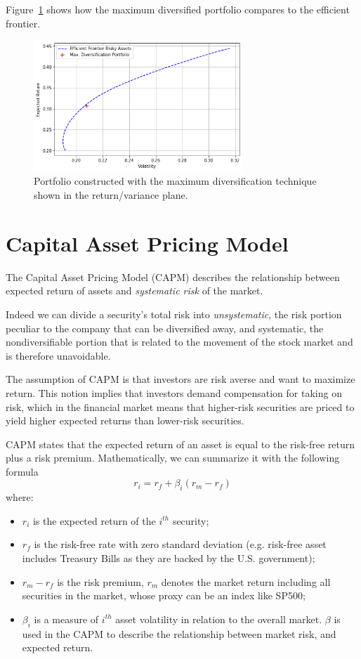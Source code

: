 Figure~\ref{fig:max_div} shows how the maximum diversified portfolio compares to the efficient frontier.

\begin{figure}[htb]
	\centering
	\includegraphics[width=0.7\textwidth]{figures/max_div.png}
	\caption{Portfolio constructed with the maximum diversification technique shown in the return/variance plane.}
	\label{fig:max_div}
\end{figure}

\section{Capital Asset Pricing Model}
\label{sec:capm}
The Capital Asset Pricing Model (CAPM) describes the relationship between expected return of assets and \emph{systematic risk} of the market.

Indeed we can divide a security’s total risk into \emph{unsystematic}, the risk portion peculiar to the company that can be diversified away, and systematic, the nondiversifiable portion that is related to the movement of the stock market and is therefore unavoidable. 

The assumption of CAPM is that investors are risk averse and want to maximize return. This notion implies that investors demand compensation for taking on risk, which in the financial market means that higher-risk securities are priced to yield higher expected returns than lower-risk securities. 

CAPM states that the expected return of an asset is equal to the risk-free return plus a risk premium. 
Mathematically, we can summarize it with the following formula
\begin{equation}
r_i = r_f + \beta_i(r_m-r_f)
\label{eq:capm}
\end{equation}
where:
\begin{itemize}
	\item $r_i$ is the expected return of the $i^{th}$ security;
	\item $r_f$ is the risk-free rate with zero standard deviation (e.g. risk-free asset includes Treasury Bills as they are backed by the U.S. government);
	\item $r_m - r_f$ is the risk premium, $r_m$ denotes the market return including all securities in the market, whose proxy can be an index like SP500;
	\item $\beta_i$ is a measure of $i^{th}$ asset volatility in relation to the overall market. 
	$\beta$ is used in the CAPM to describe the relationship between market risk, and expected return.
\end{itemize}
	
